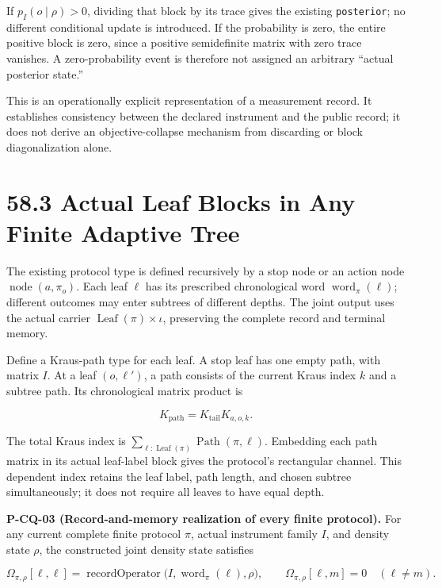 \documentclass[
  11pt,
  oneside]{book}
\begin{document}
If \(p_I(o\mid\rho)>0\), dividing that block by its trace gives the
existing \texttt{posterior}; no different conditional update is
introduced. If the probability is zero, the entire positive block is
zero, since a positive semidefinite matrix with zero trace vanishes. A
zero-probability event is therefore not assigned an arbitrary ``actual
posterior state.''

This is an operationally explicit representation of a measurement
record. It establishes consistency between the declared instrument and
the public record; it does not derive an objective-collapse mechanism
from discarding or block diagonalization alone.

\section{58.3 Actual Leaf Blocks in Any Finite Adaptive Tree}

The existing protocol type is defined recursively by a stop node or an
action node \(\operatorname{node}(a,\pi_o)\). Each leaf \(\ell\) has its
prescribed chronological word \(\operatorname{word}_\pi(\ell)\);
different outcomes may enter subtrees of different depths. The joint
output uses the actual carrier \(\operatorname{Leaf}(\pi)\times\iota\),
preserving the complete record and terminal memory.

Define a Kraus-path type for each leaf. A stop leaf has one empty path,
with matrix \(I\). At a leaf \((o,\ell')\), a path consists of the
current Kraus index \(k\) and a subtree path. Its chronological matrix
product is

\[
K_{\text{path}}=K_{\text{tail}}K_{a,o,k}.
\]

The total Kraus index is
\(\sum_{\ell:\operatorname{Leaf}(\pi)}\operatorname{Path}(\pi,\ell)\).
Embedding each path matrix in its actual leaf-label block gives the
protocol's rectangular channel. This dependent index retains the leaf
label, path length, and chosen subtree simultaneously; it does not
require all leaves to have equal depth.

\label{p-cq-03}{}

\textbf{P-CQ-03 (Record-and-memory realization of every finite
protocol).} For any current complete finite protocol \(\pi\), actual
instrument family \(I\), and density state \(\rho\), the constructed
joint density state satisfies

\[
\Omega_{\pi,\rho}[\ell,\ell]
=\operatorname{recordOperator}\bigl(I,\operatorname{word}_\pi(\ell),\rho\bigr),
\qquad
\Omega_{\pi,\rho}[\ell,m]=0\quad(\ell\ne m).
\]
\end{document}
